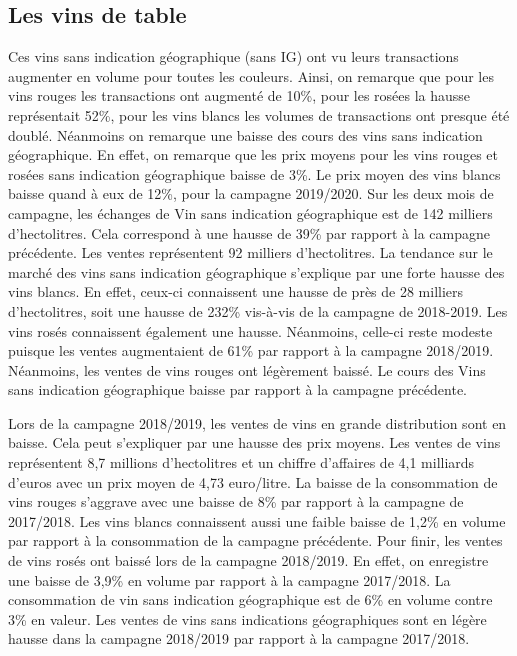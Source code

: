 \documentclass[11pt,]{article}
\begin{document}
\par

\hypertarget{les-vins-de-table}{%
\subsection{Les vins de table}\label{les-vins-de-table}}

Ces vins sans indication géographique (sans IG) ont vu leurs
transactions augmenter en volume pour toutes les couleurs. Ainsi, on
remarque que pour les vins rouges les transactions ont augmenté de 10\%,
pour les rosées la hausse représentait 52\%, pour les vins blancs les
volumes de transactions ont presque été doublé. Néanmoins on remarque
une baisse des cours des vins sans indication géographique. En effet, on
remarque que les prix moyens pour les vins rouges et rosées sans
indication géographique baisse de 3\%. Le prix moyen des vins blancs
baisse quand à eux de 12\%, pour la campagne 2019/2020. Sur les deux
mois de campagne, les échanges de Vin sans indication géographique est
de 142 milliers d'hectolitres. Cela correspond à une hausse de 39\% par
rapport à la campagne précédente. Les ventes représentent 92 milliers
d'hectolitres. La tendance sur le marché des vins sans indication
géographique s'explique par une forte hausse des vins blancs. En effet,
ceux-ci connaissent une hausse de près de 28 milliers d'hectolitres,
soit une hausse de 232\% vis-à-vis de la campagne de 2018-2019. Les vins
rosés connaissent également une hausse. Néanmoins, celle-ci reste
modeste puisque les ventes augmentaient de 61\% par rapport à la
campagne 2018/2019. Néanmoins, les ventes de vins rouges ont légèrement
baissé. Le cours des Vins sans indication géographique baisse par
rapport à la campagne précédente.

\par

Lors de la campagne 2018/2019, les ventes de vins en grande distribution
sont en baisse. Cela peut s'expliquer par une hausse des prix moyens.
Les ventes de vins représentent 8,7 millions d'hectolitres et un chiffre
d'affaires de 4,1 milliards d'euros avec un prix moyen de 4,73
euro/litre. La baisse de la consommation de vins rouges s'aggrave avec
une baisse de 8\% par rapport à la campagne de 2017/2018. Les vins
blancs connaissent aussi une faible baisse de 1,2\% en volume par
rapport à la consommation de la campagne précédente. Pour finir, les
ventes de vins rosés ont baissé lors de la campagne 2018/2019. En effet,
on enregistre une baisse de 3,9\% en volume par rapport à la campagne
2017/2018. La consommation de vin sans indication géographique est de
6\% en volume contre 3\% en valeur. Les ventes de vins sans indications
géographiques sont en légère hausse dans la campagne 2018/2019 par
rapport à la campagne 2017/2018.
\end{document}
